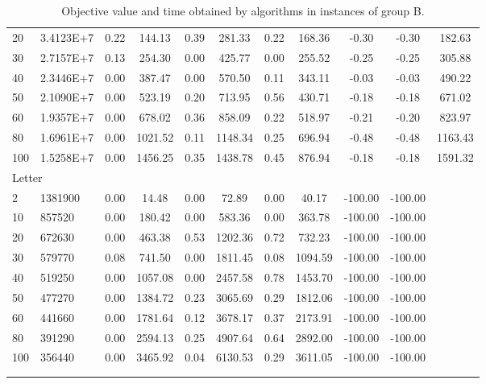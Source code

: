{\begin{longtable}{@{}llccccccccc@{}}
20  & 3.4123E+7  & 0.22        & 144.13        & 0.39      & 281.33       & 0.22      & 168.36      & -0.30     & -0.30     & 182.63  \\
30  & 2.7157E+7  & 0.13        & 254.30        & 0.00      & 425.77       & 0.00      & 255.52      & -0.25     & -0.25     & 305.88  \\
40  & 2.3446E+7  & 0.00        & 387.47        & 0.00      & 570.50       & 0.11      & 343.11      & -0.03     & -0.03     & 490.22  \\
50  & 2.1090E+7  & 0.00        & 523.19        & 0.20      & 713.95       & 0.56      & 430.71      & -0.18     & -0.18     & 671.02  \\
60  & 1.9357E+7  & 0.00        & 678.02        & 0.36      & 858.09       & 0.22      & 518.97      & -0.21     & -0.20     & 823.97  \\
80  & 1.6961E+7  & 0.00        & 1021.52       & 0.11      & 1148.34      & 0.25      & 696.94      & -0.48     & -0.48     & 1163.43 \\
100 & 1.5258E+7  & 0.00        & 1456.25       & 0.35      & 1438.78      & 0.45      & 876.94      & -0.18     & -0.18     & 1591.32 \\
\multicolumn{11}{l}{Letter}                                                                                                           \\
2   & 1381900    & 0.00        & 14.48         & 0.00      & 72.89        & 0.00      & 40.17       & -100.00   & -100.00   &         \\
10  & 857520     & 0.00        & 180.42        & 0.00      & 583.36       & 0.00      & 363.78      & -100.00   & -100.00   &         \\
20  & 672630     & 0.00        & 463.38        & 0.53      & 1202.36      & 0.72      & 732.23      & -100.00   & -100.00   &         \\
30  & 579770     & 0.08        & 741.50        & 0.00      & 1811.45      & 0.08      & 1094.59     & -100.00   & -100.00   &         \\
40  & 519250     & 0.00        & 1057.08       & 0.00      & 2457.58      & 0.78      & 1453.70     & -100.00   & -100.00   &         \\
50  & 477270     & 0.00        & 1384.72       & 0.23      & 3065.69      & 0.29      & 1812.06     & -100.00   & -100.00   &         \\
60  & 441660     & 0.00        & 1781.64       & 0.12      & 3678.17      & 0.37      & 2173.91     & -100.00   & -100.00   &         \\
80  & 391290     & 0.00        & 2594.13       & 0.25      & 4907.64      & 0.64      & 2892.00     & -100.00   & -100.00   &         \\
100 & 356440     & 0.00        & 3465.92       & 0.04      & 6130.53      & 0.29      & 3611.05     & -100.00   & -100.00   &         \\ \bottomrule
\caption{Objective value and time obtained by algorithms in instances of group B.}\\
\label{results-all-B}\\
\end{longtable}}
